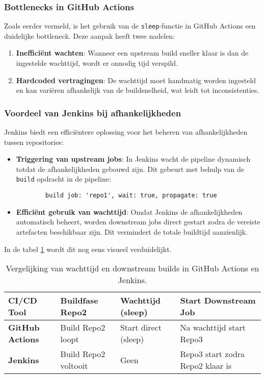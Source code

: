 \subsubsection{Bottlenecks in GitHub Actions}
Zoals eerder vermeld, is het gebruik van de \texttt{sleep}-functie in GitHub Actions een duidelijke bottleneck. Deze aanpak heeft twee nadelen:
\begin{enumerate}
    \item \textbf{Inefficiënt wachten}: Wanneer een upstream build sneller klaar is dan de ingestelde wachttijd, wordt er onnodig tijd verspild.
    \item \textbf{Hardcoded vertragingen}: De wachttijd moet handmatig worden ingesteld en kan variëren afhankelijk van de buildsnelheid, wat leidt tot inconsistenties.
\end{enumerate}

\subsubsection{Voordeel van Jenkins bij afhankelijkheden}
Jenkins biedt een efficiëntere oplossing voor het beheren van afhankelijkheden tussen repositories:
\begin{itemize}
    \item \textbf{Triggering van upstream jobs}: In Jenkins wacht de pipeline dynamisch totdat de afhankelijkheden gebouwd zijn. Dit gebeurt met behulp van de \texttt{build} opdracht in de pipeline:
    \begin{verbatim}
        build job: 'repo1', wait: true, propagate: true
    \end{verbatim}
    \item \textbf{Efficiënt gebruik van wachttijd}: Omdat Jenkins de afhankelijkheden automatisch beheert, worden downstream jobs direct gestart zodra de vereiste artefacten beschikbaar zijn. Dit vermindert de totale buildtijd aanzienlijk.
\end{itemize}

In de tabel \ref{tab:wait_time_comparison} wordt dit nog eens visueel verduidelijkt.

\begin{table}[h!]
    \centering
    \caption{Vergelijking van wachttijd en downstream builds in GitHub Actions en Jenkins.}
    \label{tab:wait_time_comparison}
    \begin{tabular}{|l|l|l|l|}
        \hline
        \textbf{CI/CD Tool}      & \textbf{Buildfase Repo2} & \textbf{Wachttijd (sleep)} & \textbf{Start Downstream Job}   \\ \hline
        \textbf{GitHub Actions}  & Build Repo2 loopt        & Start direct (sleep)       & Na wachttijd start Repo3        \\ \hline
        \textbf{Jenkins}         & Build Repo2 voltooit     & Geen                       & Repo3 start zodra Repo2 klaar is \\ \hline
    \end{tabular}
\end{table}


